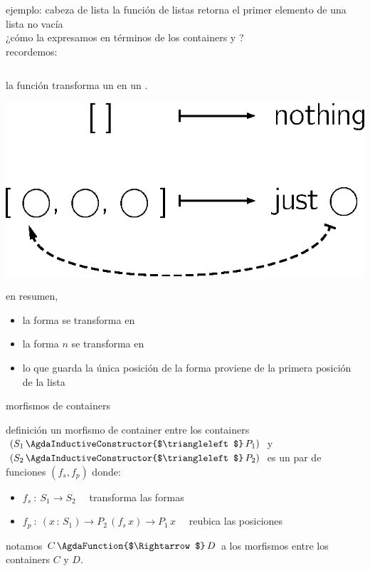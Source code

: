 \documentclass[9pt]{beamer}
\newcommand{\saltar}{\vspace{1ex}}
\begin{document}
\begin{frame}[fragile]{ejemplo: cabeza de lista}
  la función  de listas retorna el primer elemento de una lista no vacía\\
  ¿cómo la expresamos en términos de los containers  y ?\\
  \pause
  recordemos:
  \begin{columns}[T,onlytextwidth]
    \hspace{-1ex}
  \end{columns}
  \pause
  la función  transforma un  en un .\\\saltar
  \begin{center}\includegraphics[scale=0.4]{img/head.eps}\end{center}
  en resumen,
    \begin{itemize}
    \item la forma  se transforma en 
    \item la forma  $n$ se transforma en 
    \item lo que guarda la única posición de la forma  proviene de la primera posición de la lista
    \end{itemize}
\end{frame}


\begin{frame}{morfismos de containers}
  \begin{block}{definición}
    un \alert{morfismo de container} entre los containers $(S_1\, \AgdaInductiveConstructor{$\triangleleft$}\, P_1)$ y $(S_2\, \AgdaInductiveConstructor{$\triangleleft$}\, P_2)$ es un par de funciones $(f_s, f_p)$ donde:
    \begin{itemize}
    \item $f_s\ :\ S_1 \to S_2\quad$ transforma las formas
    \item $f_p\ :\ (x\, :\, S_1) \to P_2\, (f_s\, x) \to P_1\, x\quad$ reubica las posiciones
    \end{itemize}\saltar
  \end{block}
  notamos $C\, \AgdaFunction{$\Rightarrow$}\, D$ a los morfismos entre los containers $C$ y $D$.
\end{frame}
\end{document}
